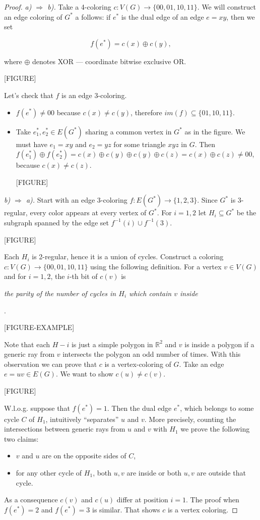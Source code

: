 \begin{proof}
\emph{a) $\Rightarrow$ b).} Take a 4-coloring $c:V(G)\rightarrow \{00,01,10,11\}$. We will construct an edge coloring of $G^*$ a follows: if $e^*$ is the dual edge of an edge $e=xy$, then we set

$$f(e^*)=c(x)\oplus c(y),$$

where $\oplus$ denotes XOR --- coordinate bitwise exclusive OR.

[FIGURE]
    
Let's check that $f$ is an edge 3-coloring.
\begin{itemize}
    \item $f(e^*)\neq 00$ because $c(x)\neq c(y)$, therefore $im(f)	\subseteq\{01,10,11\}$.
    \item Take $e_1^*,e_2^*\in E(G^*)$ sharing a common vertex in $G^*$ as in the figure. We must have $e_1=xy$ and $e_2=yz$ for some triangle $xyz$ in $G$. Then $f(e_1^*)\oplus f(e_2^*)=c(x)\oplus c(y) \oplus c(y)\oplus c(z)=c(x)\oplus c(z) \neq 00$, because $c(x)\neq c(z)$.

        [FIGURE]
\end{itemize}

\smallskip    
\emph{b) $\Rightarrow$ a).} Start with an edge 3-coloring $f:E(G^*)\rightarrow \{1,2,3\}$. Since $G^*$ is $3$-regular, every color appears at every vertex of $G^*$. For $i=1,2$ let $H_i \subseteq G^*$ be the subgraph spanned by the edge set $f^{-1}(i)\cup f^{-1}(3)$.
  
[FIGURE]

Each $H_i$ is 2-regular, hence it is a union of cycles. Construct a coloring $c:V(G)\rightarrow \{00,01,10,11\}$ using the following definition. For a vertex $v\in V(G)$ and for $i=1,2$, the $i$-th bit of $c(v)$ is \begin{center}\emph{the parity of the number of cycles in $H_i$ which contain $v$ inside}\end{center}.

[FIGURE-EXAMPLE]

Note that each $H-i$ is just a simple polygon in $\mathbb{R}^2$ and $v$ is inside a polygon if a generic ray from $v$ intersects the polygon an odd number of times. With this observation we can prove that $c$ is a vertex-coloring of $G$. Take an edge $e=uv\in E(G)$. We want to show $c(u)\neq c(v)$. 

[FIGURE]

W.l.o.g. suppose that $f(e^*)=1$. Then the dual edge $e^*$, which belongs to some cycle $C$ of $H_1$, intuitively ``separates'' $u$ and $v$. More precisely, counting the intersections between generic rays from $u$ and $v$ with $H_1$ we prove the following two claims:

\begin{itemize}
    \item $v$ and $u$ are on the opposite sides of $C$,
    \item for any other cycle of $H_1$, both $u,v$ are inside or both $u,v$ are outside that cycle.
\end{itemize}
As a consequence $c(v)$ and $c(u)$ differ at position $i=1$. The proof when $f(e^*)=2$ and $f(e^*)=3$ is similar. That shows $c$ is a vertex coloring.
\end{proof}
